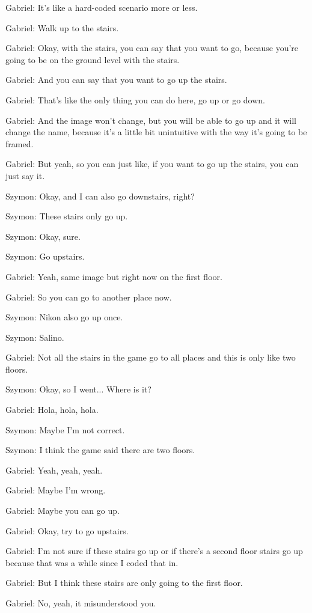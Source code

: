 Gabriel: It's like a hard-coded scenario more or less.

Gabriel: Walk up to the stairs.

Gabriel: Okay, with the stairs, you can say that you want to go, because you're going to be on the ground level with the stairs.

Gabriel: And you can say that you want to go up the stairs.

Gabriel: That's like the only thing you can do here, go up or go down.

Gabriel: And the image won't change, but you will be able to go up and it will change the name, because it's a little bit unintuitive with the way it's going to be framed.

Gabriel: But yeah, so you can just like, if you want to go up the stairs, you can just say it.

Szymon: Okay, and I can also go downstairs, right?

Szymon: These stairs only go up.

Szymon: Okay, sure.

Szymon: Go upstairs.

Gabriel: Yeah, same image but right now on the first floor.

Gabriel: So you can go to another place now.

Szymon: Nikon also go up once.

Szymon: Salino.

Gabriel: Not all the stairs in the game go to all places and this is only like two floors.

Szymon: Okay, so I went... Where is it?

Gabriel: Hola, hola, hola.

Szymon: Maybe I'm not correct.

Szymon: I think the game said there are two floors.

Gabriel: Yeah, yeah, yeah.

Gabriel: Maybe I'm wrong.

Gabriel: Maybe you can go up.

Gabriel: Okay, try to go upstairs.

Gabriel: I'm not sure if these stairs go up or if there's a second floor stairs go up because that was a while since I coded that in.

Gabriel: But I think these stairs are only going to the first floor.

Gabriel: No, yeah, it misunderstood you.

